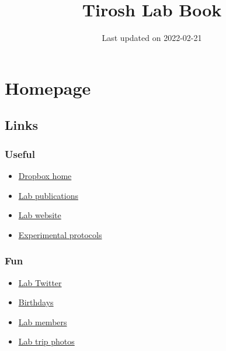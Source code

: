 \documentclass[
]{book}
\title{Tirosh Lab Book}
\author{}
\date{\vspace{-2.5em}Last updated on 2022-02-21}
\providecommand{\tightlist}{%
  \setlength{\itemsep}{0pt}\setlength{\parskip}{0pt}}
\begin{document}
\maketitle

{
\setcounter{tocdepth}{1}
\tableofcontents
}
\hypertarget{homepage}{%
\chapter{Homepage}\label{homepage}}

\hypertarget{links}{%
\section{Links}\label{links}}

\hypertarget{useful}{%
\subsection{Useful}\label{useful}}

\begin{itemize}
\tightlist
\item
  \href{https://www.dropbox.com/home/Tirosh\%20Lab}{Dropbox home}\\
\item
  \href{http://www.weizmann.ac.il/mcb/tirosh/publications-0}{Lab publications}\\
\item
  \href{http://www.weizmann.ac.il/mcb/tirosh/}{Lab website}\\
\item
  \href{https://www.dropbox.com/sh/javjoi26i5k5f6t/AADAX4RgSZUFuBwtS6TRE3wua?dl=0}{Experimental protocols}
\end{itemize}

\hypertarget{fun}{%
\subsection{Fun}\label{fun}}

\begin{itemize}
\tightlist
\item
  \href{https://twitter.com/tiroshlab}{Lab Twitter}\\
\item
  \href{https://www.dropbox.com/s/zwss5fg9rkoz7pp/lab\%20bday\%20list.xlsx?dl=0}{Birthdays}\\
\item
  \href{http://www.weizmann.ac.il/mcb/tirosh/group-members}{Lab members}\\
\item
  \href{http://www.weizmann.ac.il/mcb/tirosh/pictures}{Lab trip photos}
\end{itemize}
\end{document}
